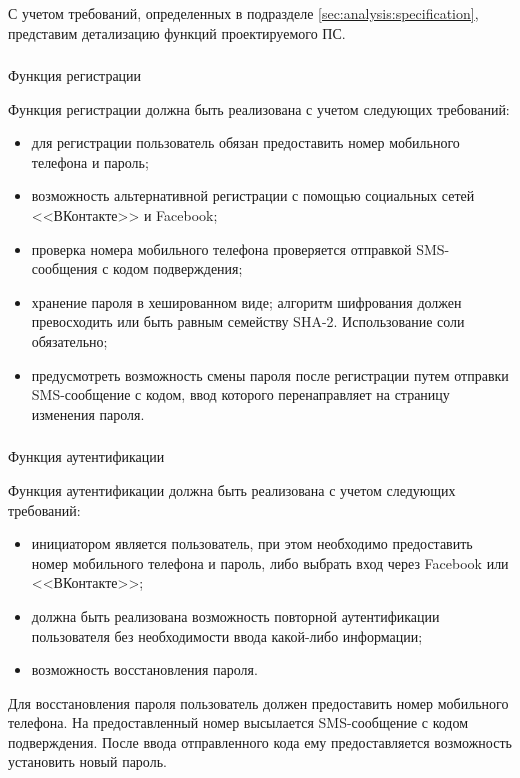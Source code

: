 С учетом требований, определенных в подразделе \ref{sec:analysis:specification}, представим детализацию функций проектируемого ПС.

\subsubsection{} Функция регистрации
\label{sec:domain:specification:signup}

Функция регистрации должна быть реализована с учетом следующих требований:
\begin{itemize}
	\item для регистрации пользователь обязан предоставить номер мобильного телефона и пароль;
	\item возможность альтернативной регистрации с помощью социальных сетей <<ВКонтакте>> и Facebook;
	\item проверка номера мобильного телефона проверяется отправкой SMS-сообщения с кодом подверждения;
	\item хранение пароля в хешированном виде; алгоритм шифрования должен превосходить или быть равным семейству SHA-2. Использование соли обязательно;
	\item предусмотреть возможность смены пароля после регистрации путем отправки SMS-сообщение с кодом, ввод которого перенаправляет на страницу изменения пароля.
\end{itemize}

\subsubsection{} Функция аутентификации
\label{sec:domain:specification:authentication}

Функция аутентификации должна быть реализована с учетом следующих требований:
\begin{itemize}
	\item инициатором является пользователь, при этом необходимо предоставить номер мобильного телефона и пароль, либо выбрать вход через Facebook или <<ВКонтакте>>;
	\item должна быть реализована возможность повторной аутентификации пользователя без необходимости ввода какой-либо информации;
	\item возможность восстановления пароля.
\end{itemize}

Для восстановления пароля пользователь должен предоставить номер мобильного телефона. На предоставленный номер высылается SMS-сообщение с кодом подверждения. После ввода отправленного кода ему предоставляется возможность установить новый пароль.

